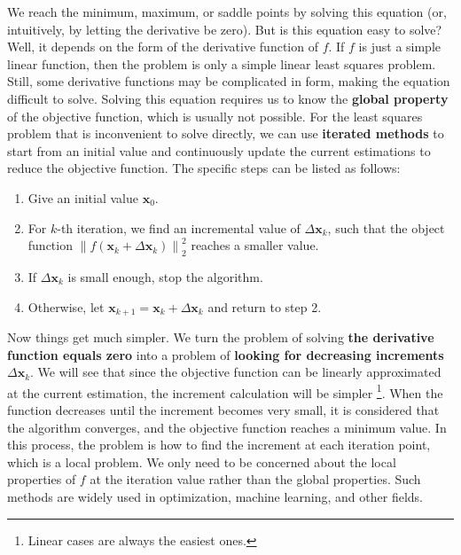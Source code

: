 We reach the minimum, maximum, or saddle points by solving this equation (or, intuitively, by letting the derivative be zero). But is this equation easy to solve? Well, it depends on the form of the derivative function of $f$. If $f$ is just a simple linear function, then the problem is only a simple linear least squares problem. Still, some derivative functions may be complicated in form, making the equation difficult to solve. Solving this equation requires us to know the \textbf{global property} of the objective function, which is usually not possible. For the least squares problem that is inconvenient to solve directly, we can use \textbf{iterated methods} to start from an initial value and continuously update the current estimations to reduce the objective function. The specific steps can be listed as follows:

\begin{mdframed}  
    \begin{enumerate}
        \item Give an initial value $\bm{x}_0$.
        \item For $k$-th iteration, we find an incremental value of $\Delta \bm{x}_k$, such that the object function $\left\| {f\left( \bm{x}_k + \Delta \bm{x}_k \right)} \right \|^2_2$ reaches a smaller value.
        \item If $\Delta \bm{x}_k$ is small enough, stop the algorithm.
        \item Otherwise, let $\bm{x}_{k+1} = \bm{x}_k+\Delta \bm{x}_k$ and return to step 2.
    \end{enumerate}
\end{mdframed}

Now things get much simpler. We turn the problem of solving \textbf{the derivative function equals zero} into a problem of \textbf{looking for decreasing increments} $\Delta \bm{x}_k$. We will see that since the objective function can be linearly approximated at the current estimation, the increment calculation will be simpler \footnote{Linear cases are always the easiest ones.}. When the function decreases until the increment becomes very small, it is considered that the algorithm converges, and the objective function reaches a minimum value. In this process, the problem is how to find the increment at each iteration point, which is a local problem. We only need to be concerned about the local properties of $f$ at the iteration value rather than the global properties. Such methods are widely used in optimization, machine learning, and other fields.

